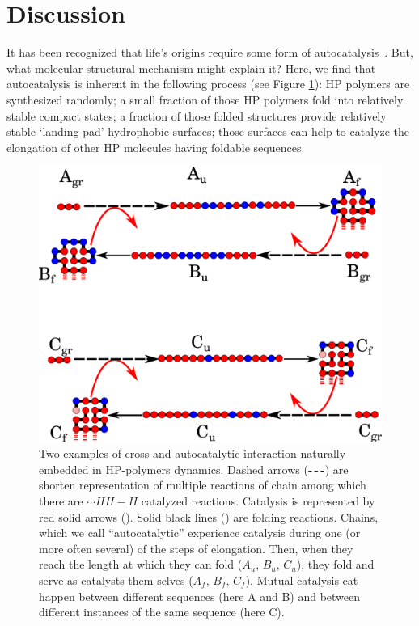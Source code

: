 \documentclass[journal=jacsat,manuscript=article,layout=twocolumn]{achemso}
\newcommand*{\red}[1]{\textcolor{red}{#1}}
\begin{document}
 



\section{Discussion}
\label{sec:evolution}
 It has been recognized that life's origins require some form of 
autocatalysis~\cite{Kauffman1986,Dyson1985,Eigen1978}.  But, what molecular structural mechanism 
might explain it?  Here, we find that autocatalysis is inherent in the following process (see 
Figure \ref{fig:kinExamples}):  HP polymers 
are synthesized randomly; a small fraction of those HP polymers fold into relatively stable 
compact 
states; a fraction of those folded structures provide relatively stable `landing pad' hydrophobic 
surfaces; those surfaces can help to catalyze the elongation of other HP molecules having foldable 
sequences.

\begin{figure}[h!]
  \centering
  \includegraphics[width=0.9\columnwidth]{pictures/catalysis-kinEx-all.pdf}
  \caption{\footnotesize{Two examples of cross and autocatalytic interaction naturally embedded in 
HP-polymers dynamics. Dashed arrows (\textbf{-\,-\,-}) are shorten representation of multiple 
reactions of chain among which there are $\cdots HH - H$ catalyzed reactions. Catalysis is 
represented by red solid arrows (\red{\textbf{\textemdash}}). Solid black lines 
(\textbf{\textemdash}) are folding reactions. Chains, which we call ``autocatalytic'' experience 
catalysis during one (or more often several) of the steps of elongation. Then, when they reach the 
length at which they can fold ($A_u,\, B_u,\, C_u$), they fold and serve as catalysts them selves 
($A_f,\, B_f,\, C_f$). Mutual catalysis cat happen between different sequences (here A and B) and 
between different instances of the same sequence (here C).}}
  \label{fig:kinExamples}
\end{figure}
\end{document}
